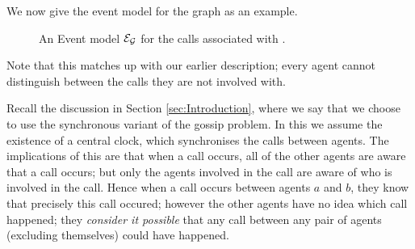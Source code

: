 \documentclass[10pt, a4paper]{report}
\begin{document}
We now give the event model for the graph  as an
example. 

\begin{figure}[h]
  \centering
  \caption{An Event model $\mathcal{E_G}$ for the calls associated with .}
  \label{fig:GossipEvMo}
\end{figure}

Note that this matches up with our earlier description; every agent cannot
distinguish between the calls they are not involved with. 

Recall the discussion in Section \ref{sec:Introduction}, where we say that we
choose to use the synchronous variant of the gossip problem. In this we assume
the existence of a central clock, which synchronises the calls between agents.
The implications of this are that when a call occurs, all of the other agents
are aware that a call occurs; but only the agents involved in the call are aware
of who is involved in the call. Hence when a call occurs between agents $a$ and
$b$, they know that precisely this call occured; however the other agents have
no idea which call happened; they \emph{consider it possible} that any call
between any pair of agents (excluding themselves) could have happened. 
\end{document}
